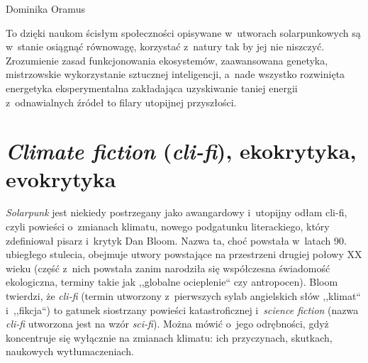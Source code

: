 \begin{artplenv}{Dominika Oramus}

To dzięki naukom ścisłym społeczności opisywane w~utworach solarpunkowych są w~stanie osiągnąć równowagę, korzystać z~natury tak by jej nie niszczyć. Zrozumienie zasad funkcjonowania ekosystemów, zaawansowana genetyka, mistrzowskie wykorzystanie sztucznej inteligencji, a~nade wszystko rozwinięta energetyka eksperymentalna zakładająca uzyskiwanie taniej energii z~odnawialnych źródeł to filary utopijnej przyszłości.

\section*{\textit{Climate fiction} (\textit{cli-fi}), ekokrytyka, evokrytyka}
\textit{Solarpunk} jest niekiedy postrzegany jako awangardowy i~utopijny odłam cli-fi, czyli powieści o~zmianach klimatu, nowego podgatunku literackiego, który zdefiniował pisarz i~krytyk Dan Bloom. Nazwa ta, choć powstała w~latach 90. ubiegłego stulecia, obejmuje utwory powstające na przestrzeni drugiej połowy XX wieku (część z~nich powstała zanim narodziła się współczesna świadomość ekologiczna, terminy takie jak ,,globalne ocieplenie`` czy antropocen). Bloom twierdzi, że \textit{cli-fi} (termin utworzony z~pierwszych sylab angielskich słów ,,klimat`` i~,,fikcja``) to gatunek siostrzany powieści katastroficznej i~\textit{science fiction} (nazwa \textit{cli-fi} utworzona jest na wzór \textit{sci-fi}). Można mówić o~jego odrębności, gdyż koncentruje się wyłącznie na zmianach klimatu: ich przyczynach, skutkach, naukowych wytłumaczeniach.


\end{artplenv}
